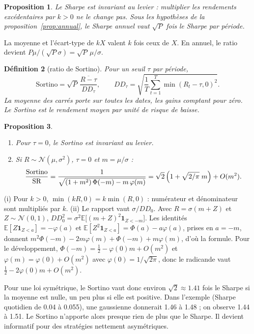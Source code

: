 \documentclass[11pt,a4paper]{article}
\makeatletter
\theoremstyle{pdef}
\newtheorem{definition}{Définition}[section]
\theoremstyle{pstate}
\newtheorem{proposition}[definition]{Proposition}
\renewenvironment{proof}[1][\proofname]{\par\pushQED{\qed}\normalfont
  \topsep6pt\trivlist\item[\hskip\labelsep{\sffamily\bfseries #1.}]\ignorespaces}
  {\popQED\endtrivlist\@endpefalse}
\newcommand{\E}{\mathbb{E}}
\newcommand{\one}{\mathbf{1}}
\newcommand{\SR}{\mathrm{SR}}
\makeatother
\begin{document}
\begin{proposition}\label{prop:srlev}
Le Sharpe est invariant au levier : multiplier les rendements excédentaires par $k>0$ ne
le change pas. Sous les hypothèses de la proposition~\ref{prop:annual}, le Sharpe annuel
vaut $\sqrt P$ fois le Sharpe par période.
\end{proposition}

\begin{proof}
La moyenne et l'écart-type de $kX$ valent $k$ fois ceux de $X$. En annuel, le ratio
devient $P\mu/(\sqrt P\sigma)=\sqrt P\,\mu/\sigma$.
\end{proof}

\begin{definition}[ratio de Sortino]
Pour un seuil $\tau$ par période,
\[
\mathrm{Sortino}=\sqrt P\,\frac{\overline{R-\tau}}{DD_\tau},\qquad
DD_\tau=\sqrt{\frac1T\sum_{t=1}^T\min(R_t-\tau,0)^2}.
\]
La moyenne des carrés porte sur \emph{toutes} les dates, les gains comptant pour zéro.
Le Sortino est le rendement moyen par unité de risque de baisse.
\end{definition}

\begin{proposition}\label{prop:sortino}
\begin{enumerate}[label=(\roman*)]
\item Pour $\tau=0$, le Sortino est invariant au levier.
\item Si $R\sim\mathcal N(\mu,\sigma^2)$, $\tau=0$ et $m=\mu/\sigma$ :
\[
\frac{\mathrm{Sortino}}{\SR}=\frac{1}{\sqrt{(1+m^2)\,\Phi(-m)-m\,\varphi(m)}}
=\sqrt2\,\Bigl(1+\sqrt{2/\pi}\;m\Bigr)+O(m^2).
\]
\end{enumerate}
\end{proposition}

\begin{proof}
(i) Pour $k>0$, $\min(kR,0)=k\min(R,0)$ : numérateur et dénominateur sont multipliés par
$k$.
(ii) Le rapport vaut $\sigma/DD_0$. Avec $R=\sigma(m+Z)$ et $Z\sim\mathcal N(0,1)$,
$DD_0^2=\sigma^2\E\bigl[(m+Z)^2\one_{Z<-m}\bigr]$. Les identités
$\E[Z\one_{Z<a}]=-\varphi(a)$ et $\E[Z^2\one_{Z<a}]=\Phi(a)-a\varphi(a)$, prises en $a=-m$,
donnent $m^2\Phi(-m)-2m\varphi(m)+\Phi(-m)+m\varphi(m)$, d'où la formule. Pour le
développement, $\Phi(-m)=\frac12-\varphi(0)m+O(m^2)$ et $\varphi(m)=\varphi(0)+O(m^2)$ avec
$\varphi(0)=1/\sqrt{2\pi}$, donc le radicande vaut $\frac12-2\varphi(0)m+O(m^2)$.
\end{proof}

Pour une loi symétrique, le Sortino vaut donc environ $\sqrt2\approx1.41$ fois le Sharpe
si la moyenne est nulle, un peu plus si elle est positive. Dans l'exemple (Sharpe
quotidien de 0.04 à 0.055), une gaussienne donnerait 1.46 à 1.48 ; on observe 1.44 à 1.51.
Le Sortino n'apporte alors presque rien de plus que le Sharpe. Il devient informatif
pour des stratégies nettement asymétriques.
\end{document}
